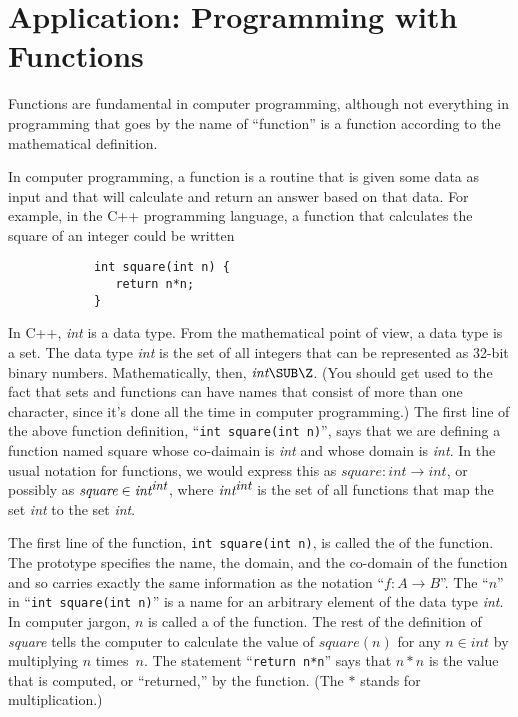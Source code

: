 \section{Application: Programming with Functions}\label{S-sets-5}

Functions are fundamental in computer programming,
although not everything in programming that goes by the name of ``function''
is a function according to the mathematical definition.

In computer programming, a function is a routine that is given 
some data as input and that will calculate and return an
answer based on that data.  For example, in the C++ programming
language, a function that calculates the square of an integer
could be written
\begin{verbatim}
            int square(int n) {
               return n*n;
            }
\end{verbatim}
In C++, \textit{int} is a data type.  From the mathematical
point of view, a data type is a set.  The data type \textit{int}
is the set of all integers that can be represented as 32-bit 
binary numbers.  Mathematically, then, $\textit{int}\SUB\Z$.
(You should get used to the fact that sets and functions can
have names that consist of more than one character, since
it's done all the time in computer programming.)
The first line of the above function definition,
``\verb=int square(int n)='', says that we are defining
a function named square whose co-daimain is \textit{int}
and whose domain is \textit{int}.  In the usual notation for
functions, we would express this as $\textit{square}\colon \textit{int}\to\textit{int}$,
or possibly as $\textit{square}\in{\textit{int}}^{\textit{\small{int}}}$,
where ${\textit{int}}^{\textit{\small{int}}}$ is the set of all
functions that map the set \textit{int} to the set \textit{int}.

The first line of the function, \verb=int square(int n)=, is called
the  of the function.  The prototype specifies the
name, the domain, and the co-domain of the function and so carries
exactly the same information as the notation ``$f\colon A\to B$''.
The ``$n$'' in ``\verb=int square(int n)='' is a name for
an arbitrary element of the data type \textit{int}.  In computer
jargon, $n$ is called a  of the function.
The rest of the definition of \textit{square} tells the computer
to calculate the value of $\textit{square}(n)$ for any $n\in\textit{int}$
by multiplying $n$ times~$n$.  The statement ``\verb=return n*n=''
says that $n*n$ is the value that is computed, or ``returned,''
by the function.  (The $*$ stands for multiplication.)

